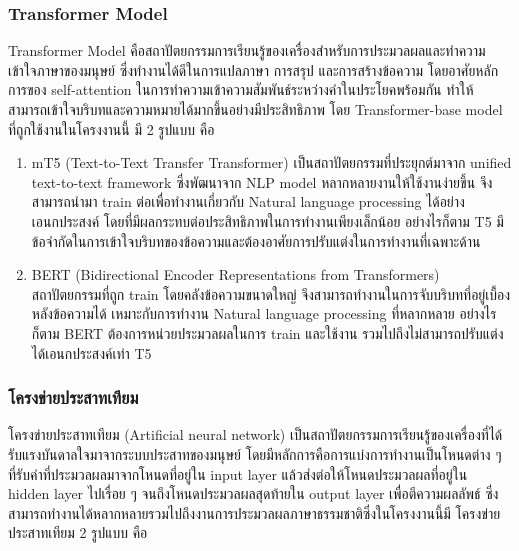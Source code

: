 \documentclass[14pt,oneside,openright,a4paper]{cpe-thai-project}
\begin{document}
\newpage

  \subsubsection {Transformer Model}
   Transformer Model \cite{Transformers} คือสถาปัตยกรรมการเรียนรู้ของเครื่องสำหรับการประมวลผลและทำความเข้าใจภาษาของมนุษย์ ซึ่งทำงานได้ดีในการแปลภาษา การสรุป และการสร้างข้อความ 
   โดยอาศัยหลักการของ self-attention ในการทำความเข้าความสัมพันธ์ระหว่างคำในประโยคพร้อมกัน ทำให้สามารถเข้าใจบริบทและความหมายได้มากขึ้นอย่างมีประสิทธิภาพ 
   โดย Transformer-base model ที่ถูกใช้งานในโครงงานนี้ มี 2 รูปแบบ คือ 
   
   \begin{enumerate}
   \item mT5 (Text-to-Text Transfer Transformer) เป็นสถาปัตยกรรมที่ประยุกต์มาจาก unified text-to-text framework ซึ่งพัฒนาจาก NLP model หลากหลายงานให้ใช้งานง่ายขึ้น จึงสามารถนำมา train ต่อเพื่อทำงานเกี่ยวกับ Natural language processing ได้อย่างเอนกประสงค์ โดยที่มีผลกระทบต่อประสิทธิภาพในการทำงานเพียงเล็กน้อย อย่างไรก็ตาม T5 มีข้อจำกัดในการเข้าใจบริบทของข้อความและต้องอาศัยการปรับแต่งในการทำงานที่เฉพาะด้าน
   \item BERT (Bidirectional Encoder Representations from Transformers) \cite{BERT}  สถาปัตยกรรมที่ถูก train โดยคลังข้อความขนาดใหญ่ จึงสามารถทำงานในการจับบริบทที่อยู่เบื้องหลังข้อความได้ เหมาะกับการทำงาน Natural language processing ที่หลากหลาย อย่างไรก็ตาม BERT ต้องการหน่วยประมวลผลในการ train และใช้งาน รวมไปถึงไม่สามารถปรับแต่งได้เอนกประสงค์เท่า T5 
   \end{enumerate} 
   
   \subsubsection {โครงข่ายประสาทเทียม}
   โครงข่ายประสาทเทียม (Artificial neural network) เป็นสถาปัตยกรรมการเรียนรู้ของเครื่องที่ได้รับแรงบันดาลใจมาจากระบบประสาทของมนุษย์ โดยมีหลักการคือการแบ่งการทำงานเป็นโหนดต่าง ๆ 
   ที่รับค่าที่ประมวลผลมาจากโหนดที่อยู่ใน input layer แล้วส่งต่อให้โหนดประมวลผลที่อยู่ใน hidden layer ไปเรื่อย ๆ จนถึงโหนดประมวลผลสุดท้ายใน output layer 
   เพื่อตีความผลลัพธ์ ซึ่งสามารถทำงานได้หลากหลายรวมไปถึงงานการประมวลผลภาษาธรรมชาติซึ่งในโครงงานนี้มี โครงข่ายประสาทเทียม 2  รูปแบบ คือ
   
\end{document}

